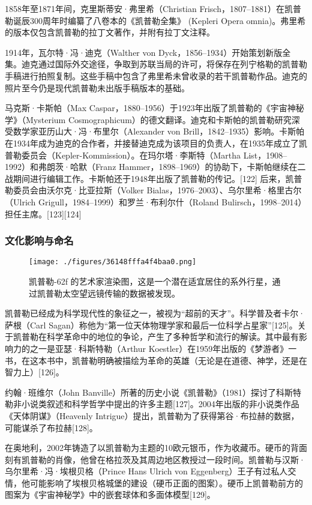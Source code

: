 1858年至1871年间，克里斯蒂安·弗里希（Christian Frisch，1807–1881）在凯普勒诞辰300周年时编纂了八卷本的《凯普勒全集》 (Kepleri Opera omnia)。弗里希的版本仅包含凯普勒的拉丁文著作，并附有拉丁文注释。

1914年，瓦尔特·冯·迪克（Walther von Dyck，1856–1934）开始策划新版全集。迪克通过国际外交途径，争取到苏联当局的许可，将保存在列宁格勒的凯普勒手稿进行拍照复制。这些手稿中包含了弗里希未曾收录的若干凯普勒作品。迪克的照片至今仍是现代凯普勒未出版手稿版本的基础。

马克斯·卡斯帕（Max Caspar，1880–1956）于1923年出版了凯普勒的《宇宙神秘学》（Mysterium Cosmographicum）的德文翻译。迪克和卡斯帕的凯普勒研究深受数学家亚历山大·冯·布里尔（Alexander von Brill，1842–1935）影响。卡斯帕在1934年成为迪克的合作者，并接替迪克成为该项目的负责人，在1935年成立了凯普勒委员会（Kepler-Kommission）。在玛尔塔·李斯特（Martha List，1908–1992）和弗朗茨·哈默（Franz Hammer，1898–1969）的协助下，卡斯帕继续在二战期间进行编辑工作。卡斯帕还于1948年出版了凯普勒的传记。[122] 后来，凯普勒委员会由沃尔克·比亚拉斯（Volker Bialas，1976–2003）、乌尔里希·格里古尔（Ulrich Grigull，1984–1999）和罗兰·布利尔什（Roland Bulirsch，1998–2014）担任主席。[123][124]
\subsubsection{文化影响与命名}
\begin{figure}[ht]
\centering
\texttt{[image: ./figures/36148fffa4f4baa0.png]}
\caption{凯普勒-62f 的艺术家渲染图，这是一个潜在适宜居住的系外行星，通过凯普勒太空望远镜传输的数据被发现。} \label{fig_KPL1_19}
\end{figure}
凯普勒已经成为科学现代性的象征之一，被视为“超前的天才”。科学普及者卡尔·萨根（Carl Sagan）称他为“第一位天体物理学家和最后一位科学占星家”[125]。关于凯普勒在科学革命中的地位的争论，产生了多种哲学和流行的解读。其中最有影响力的之一是亚瑟·科斯特勒（Arthur Koestler）在1959年出版的《梦游者》一书，在这本书中，凯普勒明确被描绘为革命的英雄（无论是在道德、神学，还是在智力上）[126]。

约翰·班维尔（John Banville）所著的历史小说《凯普勒》（1981）探讨了科斯特勒非小说类叙述和科学哲学中提出的许多主题[127]。2004年出版的非小说类作品《天体阴谋》（Heavenly Intrigue）提出，凯普勒为了获得第谷·布拉赫的数据，可能谋杀了布拉赫[128]。

在奥地利，2002年铸造了以凯普勒为主题的10欧元银币，作为收藏币。硬币的背面刻有凯普勒的肖像，他曾在格拉茨及其周边地区教授过一段时间。凯普勒与汉斯·乌尔里希·冯·埃根贝格（Prince Hans Ulrich von Eggenberg）王子有过私人交情，他可能影响了埃根贝格城堡的建设（硬币正面的图案）。硬币上凯普勒前方的图案为《宇宙神秘学》中的嵌套球体和多面体模型[129]。


